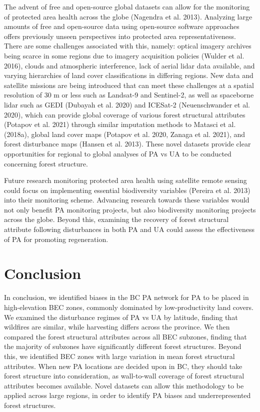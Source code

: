 \documentclass[10pt,oneside]{article}
\begin{document}
The advent of free and open-source global datasets can allow for the
monitoring of protected area health across the globe (Nagendra et al.
2013). Analyzing large amounts of free and open-source data using
open-source software approaches offers previously unseen perspectives
into protected area representativeness. There are some challenges
associated with this, namely: optical imagery archives being scarce in
some regions due to imagery acquisition policies (Wulder et al. 2016),
clouds and atmospheric interference, lack of aerial lidar data
available, and varying hierarchies of land cover classifications in
differing regions. New data and satellite missions are being introduced
that can meet these challenges at a spatial resolution of 30 m or less
such as Landsat-9 and Sentinel-2, as well as spaceborne lidar such as
GEDI (Dubayah et al. 2020) and ICESat-2 (Neuenschwander et al. 2020),
which can provide global coverage of various forest structural
attributes (Potapov et al. 2021) through similar imputation methods to
Matasci et al. (2018a), global land cover maps (Potapov et al. 2020,
Zanaga et al. 2021), and forest disturbance maps (Hansen et al. 2013).
These novel datasets provide clear opportunities for regional to global
analyses of PA vs UA to be conducted concerning forest structure.

Future research monitoring protected area health using satellite remote
sensing could focus on implementing essential biodiversity variables
(Pereira et al. 2013) into their monitoring scheme. Advancing research
towards these variables would not only benefit PA monitoring projects,
but also biodiversity monitoring projects across the globe. Beyond this,
examining the recovery of forest structural attribute following
disturbances in both PA and UA could assess the effectiveness of PA for
promoting regeneration.

\hypertarget{conclusion}{%
\section{Conclusion}\label{conclusion}}

In conclusion, we identified biases in the BC PA network for PA to be
placed in high-elevation BEC zones, commonly dominated by
low-productivity land covers. We examined the disturbance regimes of PA
vs UA by latitude, finding that wildfires are similar, while harvesting
differs across the province. We then compared the forest structural
attributes across all BEC subzones, finding that the majority of
subzones have significantly different forest structures. Beyond this, we
identified BEC zones with large variation in mean forest structural
attributes. When new PA locations are decided upon in BC, they should
take forest structure into consideration, as wall-to-wall coverage of
forest structural attributes becomes available. Novel datasets can allow
this methodology to be applied across large regions, in order to
identify PA biases and underrepresented forest structures.
\end{document}
